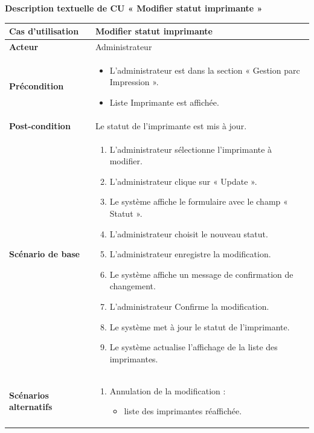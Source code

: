 \documentclass[a4paper,11pt]{report}
\begin{document}
\newpage
\textbf{Description textuelle de CU « Modifier statut imprimante »}

\begin{tabularx}{\textwidth}{|>{\bfseries}l|X|}
\hline
Cas d’utilisation    & Modifier statut imprimante \\
\hline
Acteur               & Administrateur \\
\hline
Précondition         &
\begin{itemize}[left=0pt]
  \item L’administrateur est dans la section « Gestion parc Impression ».
  \item Liste Imprimante est affichée.
  \end{itemize} \\
\hline
Post-condition       & Le statut de l’imprimante est mis à jour. \\
\hline
Scénario de base     &
\begin{enumerate}[left=0pt]
  \item L’administrateur sélectionne l’imprimante à modifier.
  \item L’administrateur clique sur « Update ».
  \item Le système affiche le formulaire avec le champ « Statut ».
  \item L’administrateur choisit le nouveau statut.
  \item L’administrateur enregistre la modification.
  \item Le système affiche un message de confirmation de changement.
  \item L’administrateur Confirme la modification.
  \item Le système met à jour le statut de l'imprimante.
  \item Le système actualise l’affichage de la liste des imprimantes.
\end{enumerate} \\
\hline
Scénarios alternatifs &
\begin{enumerate}[label=\arabic*.a,wide=0pt,left=0pt]
  \item[7.a] Annulation de la modification :
    \begin{itemize}[left=1em]
      \item liste des imprimantes réaffichée.
    \end{itemize}
\end{enumerate} \\
\hline
\end{tabularx}
\end{document}
